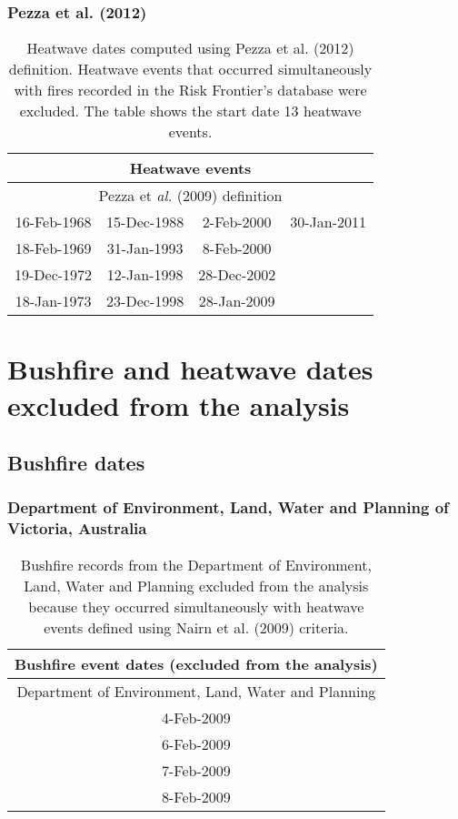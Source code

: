 \subsubsection{Pezza et al. (2012) }

\begin{table}[H]
\caption{Heatwave dates computed using Pezza et al. (2012) definition. Heatwave
events that occurred simultaneously with fires recorded in the Risk
Frontier's database were excluded. The table shows the start date
13 heatwave events. \label{tab:Heatwave dates computed using Pezza et al. (2012) definition}}


\centering{}%
\begin{tabular}{|c|c|c|c|}
\hline 
\multicolumn{4}{|c|}{\textbf{Heatwave events }}\tabularnewline
\hline 
\hline 
\multicolumn{4}{|c|}{Pezza et \textit{al.} (2009) definition}\tabularnewline
\hline 
16-Feb-1968 & 15-Dec-1988 & 2-Feb-2000 & 30-Jan-2011\tabularnewline
\hline 
18-Feb-1969 & 31-Jan-1993 & 8-Feb-2000 & \tabularnewline
\hline 
19-Dec-1972 & 12-Jan-1998 & 28-Dec-2002 & \tabularnewline
\hline 
18-Jan-1973 & 23-Dec-1998 & 28-Jan-2009 & \tabularnewline
\hline 
\end{tabular}
\end{table}



\section{Bushfire and heatwave dates excluded from the analysis}


\subsection{Bushfire dates}


\subsubsection{Department of Environment, Land, Water and Planning of Victoria,
Australia }

\begin{table}[H]
\caption{Bushfire records from the Department of Environment, Land, Water and
Planning excluded from the analysis because they occurred simultaneously
with heatwave events defined using Nairn et al. (2009) criteria. }


\centering{}%
\begin{tabular}{|c|}
\hline 
\textbf{Bushfire event dates (excluded from the analysis)}\tabularnewline
\hline 
\hline 
Department of Environment, Land, Water and Planning\tabularnewline
\hline 
4-Feb-2009\tabularnewline
\hline 
6-Feb-2009\tabularnewline
\hline 
7-Feb-2009\tabularnewline
\hline 
8-Feb-2009\tabularnewline
\hline 
\end{tabular}
\end{table}



